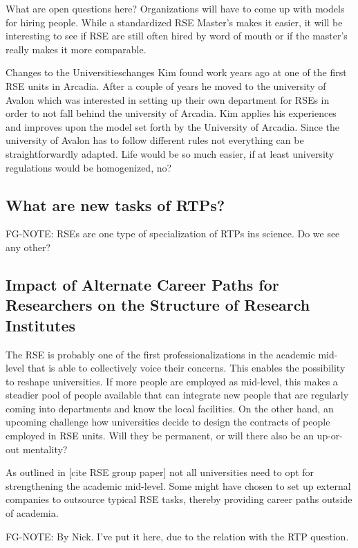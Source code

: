 \documentclass{eceasst}
\begin{document}
What are open questions here?
Organizations will have to come up with models for hiring people. While
a standardized RSE Master's makes it easier, it will be interesting to see if
RSE are still often hired by word of mouth or if the master's really makes it more comparable.

\begin{story}{Changes to the Universities}{changes}
Kim found work years ago at one of the first RSE units in Arcadia. After a couple of years he moved to the university of
Avalon which was interested in setting up their own department for RSEs in order to not fall behind the university of Arcadia.
Kim applies his experiences and improves upon the model set forth by the University of Arcadia. Since the university
of Avalon has to follow different rules not everything can be straightforwardly adapted. Life would be so much easier,
if at least university regulations would be homogenized, no?
\end{story}

\subsection{What are new tasks of RTPs?}
 FG-NOTE: RSEs are one type of specialization of RTPs ins science. Do we see any other?

\subsection{Impact of Alternate Career Paths for Researchers on the Structure of Research Institutes}
The RSE is probably one of the first professionalizations in the academic mid-level that is able
to collectively voice their concerns. This enables the possibility to reshape universities.
If more people are employed as mid-level, this makes a steadier pool of people
available that can integrate new people that are regularly coming into departments and know the local facilities.
On the other hand, an upcoming challenge how universities decide to design the contracts of people employed
in RSE units. Will they be permanent, or will there also be an up-or-out mentality?

As outlined in [cite RSE group paper] not all universities need to opt for strengthening
the academic mid-level. Some might have chosen to set up external companies to outsource typical RSE tasks,
thereby providing career paths outside of academia.

FG-NOTE: By Nick. I've put it here, due to the relation with the RTP question.
\end{document}
